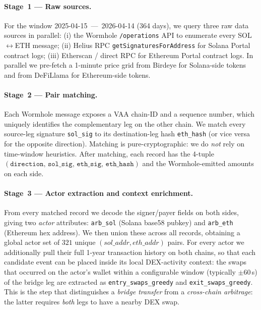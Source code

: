 \documentclass[11pt,a4paper]{article}
\begin{document}
\paragraph{Stage~1 --- Raw sources.} For the window
2025-04-15~---~2026-04-14 (364 days), we query three raw data sources in
parallel: (i) the Wormhole \texttt{/operations} API to enumerate every
SOL$\leftrightarrow$ETH message; (ii) Helius RPC
\texttt{getSignaturesForAddress} for Solana Portal contract logs;
(iii) Etherscan / direct RPC for Ethereum Portal contract logs. In parallel
we pre-fetch a 1-minute price grid from Birdeye for Solana-side tokens and
from DeFiLlama for Ethereum-side tokens.

\paragraph{Stage~2 --- Pair matching.} Each Wormhole message exposes a
VAA chain-ID and a sequence number, which uniquely identifies the
complementary leg on the other chain. We match every source-leg signature
\texttt{sol\_sig} to its destination-leg hash \texttt{eth\_hash} (or vice
versa for the opposite direction). Matching is pure-cryptographic: we do
\emph{not} rely on time-window heuristics. After matching, each record has
the 4-tuple $(\texttt{direction, sol\_sig, eth\_sig, eth\_hash})$ and the
Wormhole-emitted amounts on each side.

\paragraph{Stage~3 --- Actor extraction and context enrichment.} From every
matched record we decode the signer/payer fields on both sides, giving two
\emph{actor} attributes: \texttt{arb\_sol} (Solana base58 pubkey) and
\texttt{arb\_eth} (Ethereum hex address). We then union these across all
records, obtaining a global actor set of $321$ unique $(sol\_addr,
eth\_addr)$ pairs. For every actor we additionally pull their full 1-year
transaction history on both chains, so that each candidate event can be
placed inside its local DEX-activity context: the swaps that occurred on
the actor's wallet within a configurable window (typically $\pm\!60$\,s) of
the bridge leg are extracted as \texttt{entry\_swaps\_greedy} and
\texttt{exit\_swaps\_greedy}. This is the step that distinguishes a
\emph{bridge transfer} from a \emph{cross-chain arbitrage}: the latter
requires \emph{both} legs to have a nearby DEX swap.
\end{document}
